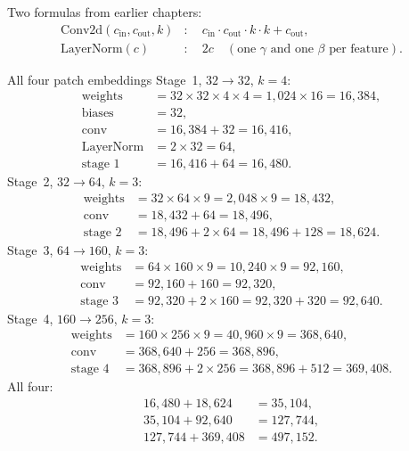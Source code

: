 Two formulas from earlier chapters:
\begin{align*}
\text{Conv2d}(c_{\text{in}}, c_{\text{out}}, k) &: \quad c_{\text{in}}\cdot c_{\text{out}}\cdot k\cdot k + c_{\text{out}},\\
\text{LayerNorm}(c) &: \quad 2c \quad (\text{one } \gamma \text{ and one } \beta \text{ per feature}).
\end{align*}

\begin{worked}[label={we:patchembed:count}]{All four patch embeddings}
Stage~1, $32\to32$, $k=4$:
\begin{align*}
\text{weights} &= 32\times32\times4\times4 = 1{,}024\times16 = 16{,}384,\\
\text{biases} &= 32,\\
\text{conv} &= 16{,}384 + 32 = 16{,}416,\\
\text{LayerNorm} &= 2\times32 = 64,\\
\text{stage 1} &= 16{,}416 + 64 = 16{,}480.
\end{align*}
Stage~2, $32\to64$, $k=3$:
\begin{align*}
\text{weights} &= 32\times64\times9 = 2{,}048\times9 = 18{,}432,\\
\text{conv} &= 18{,}432 + 64 = 18{,}496,\\
\text{stage 2} &= 18{,}496 + 2\times64 = 18{,}496 + 128 = 18{,}624.
\end{align*}
Stage~3, $64\to160$, $k=3$:
\begin{align*}
\text{weights} &= 64\times160\times9 = 10{,}240\times9 = 92{,}160,\\
\text{conv} &= 92{,}160 + 160 = 92{,}320,\\
\text{stage 3} &= 92{,}320 + 2\times160 = 92{,}320 + 320 = 92{,}640.
\end{align*}
Stage~4, $160\to256$, $k=3$:
\begin{align*}
\text{weights} &= 160\times256\times9 = 40{,}960\times9 = 368{,}640,\\
\text{conv} &= 368{,}640 + 256 = 368{,}896,\\
\text{stage 4} &= 368{,}896 + 2\times256 = 368{,}896 + 512 = 369{,}408.
\end{align*}
All four:
\begin{align*}
16{,}480 + 18{,}624 &= 35{,}104,\\
35{,}104 + 92{,}640 &= 127{,}744,\\
127{,}744 + 369{,}408 &= 497{,}152.
\end{align*}
\end{worked}

